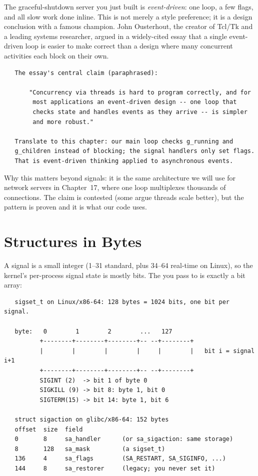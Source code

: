 \begin{researchnote}
The graceful-shutdown server you just built is \emph{event-driven}: one
loop, a few flags, and all slow work done inline. This is not merely a
style preference; it is a design conclusion with a famous champion.
John Ousterhout, the creator of Tcl/Tk and a leading systems
researcher, argued in a widely-cited essay that a single event-driven
loop is easier to make correct than a design where many concurrent
activities each block on their own.

\begin{verbatim}
   The essay's central claim (paraphrased):

       "Concurrency via threads is hard to program correctly, and for
        most applications an event-driven design -- one loop that
        checks state and handles events as they arrive -- is simpler
        and more robust."

   Translate to this chapter: our main loop checks g_running and
   g_children instead of blocking; the signal handlers only set flags.
   That is event-driven thinking applied to asynchronous events.
\end{verbatim}

Why this matters beyond signals: it is the same architecture we will
use for network servers in Chapter~17, where one loop multiplexes
thousands of connections. The claim is contested (some argue threads
scale better), but the pattern is proven and it is what our code uses.

\end{researchnote}

\section{Structures in Bytes}

A signal is a small integer (1--31 standard, plus 34--64 real-time on
Linux), so the kernel's per-process signal state is mostly bits. The
 you pass to  is exactly a bit array:

\begin{verbatim}
   sigset_t on Linux/x86-64: 128 bytes = 1024 bits, one bit per signal.

   byte:   0        1        2        ...   127
          +--------+--------+--------+-- --+--------+
          |        |        |        |     |        |   bit i = signal i+1
          +--------+--------+--------+-- --+--------+
          SIGINT (2)  -> bit 1 of byte 0
          SIGKILL (9) -> bit 8: byte 1, bit 0
          SIGTERM(15) -> bit 14: byte 1, bit 6

   struct sigaction on glibc/x86-64: 152 bytes
   offset  size  field
   0       8     sa_handler      (or sa_sigaction: same storage)
   8       128   sa_mask         (a sigset_t)
   136     4     sa_flags        (SA_RESTART, SA_SIGINFO, ...)
   144     8     sa_restorer     (legacy; you never set it)
\end{verbatim}

